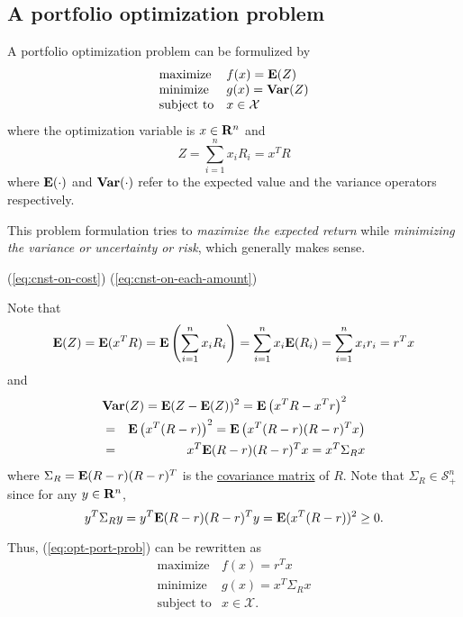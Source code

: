 \documentclass[10pt, twoside]{book}   	%
\newcommand{\possemidefset}[1]{\mathcal{S}_+^{#1}}
\newcommand{\covmat}[1]{{\Sigma}_{#1}}
\begin{document}
\subsection{A portfolio optimization problem}

A portfolio optimization problem can be formulized by
\begin{equation}
\label{eq:opt-port-prob}
\begin{array}{ll}
\mbox{maximize} & f(x) = \mathbf{E}(Z)
\\
\mbox{minimize} & g(x) = \mathop{\bf Var{}}(Z)
\\
\mbox{subject to} & x \in \mathcal{X}
\end{array}
\end{equation}
where the optimization variable is $x\in\mathbf{R}^n$
and
\begin{equation}
Z = \sum_{i=1}^n x_i R_i = x^T R
\end{equation}
where $\mathbf{E}(\cdot)$ and $\mathop{\bf Var{}}(\cdot)$ refer to the expected value and the variance operators respectively.

This problem formulation tries to \emph{maximize the expected return}
while \emph{minimizing the variance or uncertainty or risk}, which generally makes sense.

(\ref{eq:cnst-on-cost})
(\ref{eq:cnst-on-each-amount})


Note that
\begin{equation}
\mathbf{E}(Z)
= \mathbf{E}(x^T R)
= \mathbf{E} \left(\sum_{i=1}^n x_i R_i \right)
= \sum_{i=1}^n x_i \mathbf{E}(R_i)
= \sum_{i=1}^n x_i r_i
= r^T x
\end{equation}
and
\begin{eqnarray*}
\lefteqn{
\Var(Z) = \Expect(Z-\Expect(Z))^2 = \Expect \left(x^TR-x^Tr \right)^2
}
\\
&=&
\Expect \left(x^T(R-r) \right)^2
= \Expect \left(x^T(R-r)(R-r)^T x \right)
\\
&=&
x^T \Expect(R-r)(R-r)^T x
=
x^T \covmat{R} x
\end{eqnarray*}
where $\covmat{R} = \Expect(R-r)(R-r)^T$ is the \href{https://en.wikipedia.org/wiki/Covariance_matrix}{covariance matrix} of $R$.
Note that $\covmat{R}\in\possemidefset{n}$
since for any $y\in\mathbf{R}^n$,
\begin{equation}
y^T \covmat{R} y = y^T \Expect(R-r)(R-r)^T y = \Expect(x^T(R-r))^2 \geq 0.
\end{equation}



Thus, (\ref{eq:opt-port-prob}) can be rewritten as
\begin{equation}
\label{eq:opt-port-prob-vec}
\begin{array}{ll}
\mbox{maximize} & f(x) = r^T x
\\
\mbox{minimize} & g(x) = x^T \covmat{R} x
\\
\mbox{subject to} & x \in \mathcal{X}.
\end{array}
\end{equation}
\end{document}
